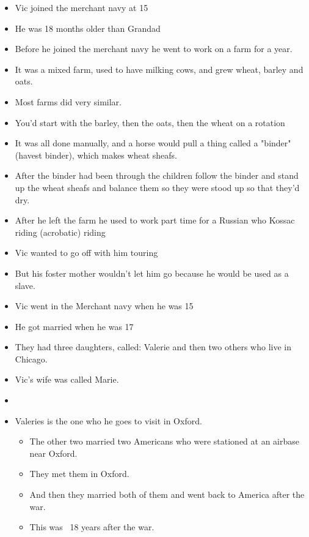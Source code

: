 \documentclass[10pt,twocolumn,letterpaper]{article}
\begin{document}
\begin{itemize}
\begin{itemize}
              \item Vic joined the merchant navy at 15
              \item He was 18 months older than Grandad
              \item Before he joined the merchant navy he went to work on a farm for a year.
              \item It was a mixed farm, used to have milking cows, and grew wheat, barley and oats.
              \item Most farms did very similar.
              \item You'd start with the barley, then the oats, then the wheat on a rotation
              \item It was all done manually, and a horse would pull a thing called a "binder" (havest binder), which makes wheat sheafs.
              \item After the binder had been through the children follow the binder and stand up the wheat sheafs and balance them so they were stood up so that they'd dry.
              \item After he left the farm he used to work part time for a Russian who Kossac riding (acrobatic) riding
              \item Vic wanted to go off with him touring
              \item But his foster mother wouldn't let him go because he would be used as a slave.
              \item Vic went in the Merchant navy when he was 15
              \item He got married when he was 17
              \item They had three daughters, called: Valerie and then two others who live in Chicago.
              \item Vic's wife was called Marie.
              \item 
              \item Valeries is the one who he goes to visit in Oxford.
                    \begin{itemize}
                        \item The other two married two Americans who were stationed at an airbase near Oxford.
                        \item They met them in Oxford.
                        \item And then they married both of them and went back to America after the war.
                        \item This was ~18 years after the war.

\end{itemize}
\end{itemize}
\end{itemize}
\end{document}
